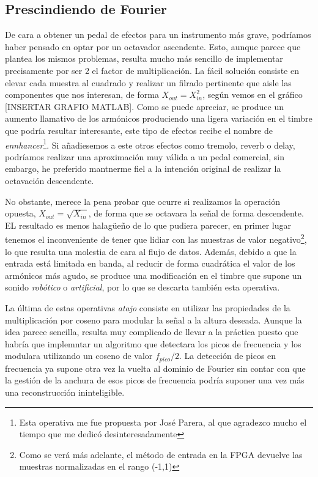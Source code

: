 \subsection{Prescindiendo de Fourier}
De cara a obtener un pedal de efectos para un instrumento más grave, podríamos haber pensado en optar por un octavador ascendente. Esto, aunque parece que plantea los mismos problemas, resulta mucho más sencillo de implementar precisamente por ser 2 el factor de multiplicación. La fácil solución consiste en elevar cada muestra al cuadrado y realizar un filrado pertinente que aisle las componentes que nos interesan, de forma $X_{out} = X_{in}^{2}$, según vemos en el gráfico [INSERTAR GRAFIO MATLAB]. Como se puede apreciar, se produce un aumento llamativo de los armónicos produciendo una ligera variación en el timbre que podría resultar interesante, este tipo de efectos recibe el nombre de \emph{ennhancer}\footnote{Esta operativa me fue propuesta por José Parera, al que agradezco mucho el tiempo que me dedicó desinteresadamente}. Si añadiesemos a este otros efectos como tremolo, reverb o delay, podríamos realizar una aproximación muy válida a un pedal comercial, sin embargo, he preferido mantnerme fiel a la intención original de realizar la octavación descendente.

No obstante, merece la pena probar que ocurre si realizamos la operación opuesta, $X_{out} = \sqrt{X_{in}}$, de forma que se octavara la señal de forma descendente. EL resultado es menos halagüeño de lo que pudiera parecer, en primer lugar tenemos el inconveniente de tener que lidiar con las muestras de valor negativo\footnote{Como se verá más adelante, el método de entrada en la FPGA devuelve las muestras normalizadas en el rango (-1,1)}, lo que resulta una molestia de cara al flujo de datos. Además, debido a que la entrada está limitada en banda, al reducir de forma cuadrática el valor de los armónicos más agudo, se produce una modificación en el timbre que supone un sonido \emph{robótico} o \emph{artificial}, por lo que se descarta también esta operativa.

La última de estas operativas \emph{atajo} consiste en utilizar las propiedades de la multiplicación por coseno para modular la señal a la altura deseada. Aunque la idea parece sencilla, resulta muy complicado de llevar a la práctica puesto que habría que implemntar un algoritmo que detectara los picos de frecuencia y los modulara utilizando un coseno de valor $f_{pico}/2$. La detección de picos en frecuencia ya supone otra vez la vuelta al dominio de Fourier sin contar con que la gestión de la anchura de esos picos de frecuencia podría suponer una vez más una reconstrucción ininteligible.

